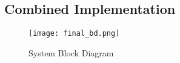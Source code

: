 \subsection{Combined Implementation}
\begin{figure}[H] 
	\centering
	\texttt{[image: final\_bd.png]}
	\caption{System Block Diagram}
	\label{finalBD}
\end{figure}